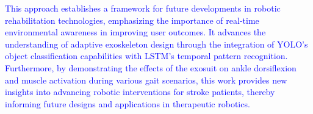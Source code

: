\documentclass[journal,article,submit,pdftex,moreauthors]{Definitions/mdpi}
\begin{document}
\textcolor{blue}{This approach establishes a framework for future developments in robotic rehabilitation technologies, emphasizing the importance of real-time environmental awareness in improving user outcomes. It advances the understanding of adaptive exoskeleton design through the integration of YOLO’s object classification capabilities with LSTM’s temporal pattern recognition. Furthermore, by demonstrating the effects of the exosuit on ankle dorsiflexion and muscle activation during various gait scenarios, this work provides new insights into advancing robotic interventions for stroke patients, thereby informing future designs and applications in therapeutic robotics.}




\vspace{6pt} 



\end{document}
